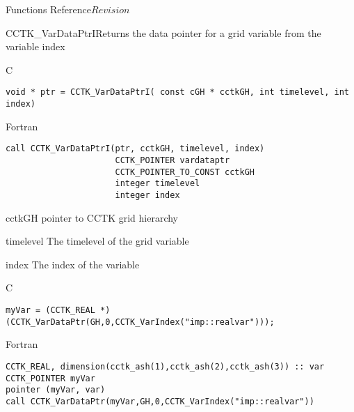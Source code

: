 \begin{cactuspart}{ Functions Reference}{}{$Revision$}
\begin{FunctionDescription}{CCTK\_VarDataPtrI}{Returns the data pointer for a grid variable from the variable index}
\label{CCTK-VarDataPtrI}
\begin{SynopsisSection}
\begin{Synopsis}{C}
\begin{verbatim}void * ptr = CCTK_VarDataPtrI( const cGH * cctkGH, int timelevel, int index)\end{verbatim}
\end{Synopsis}
\begin{Synopsis}{Fortran}
\begin{verbatim}
call CCTK_VarDataPtrI(ptr, cctkGH, timelevel, index)
                      CCTK_POINTER vardataptr
                      CCTK_POINTER_TO_CONST cctkGH
                      integer timelevel
                      integer index
\end{verbatim}
\end{Synopsis}
\end{SynopsisSection}
\begin{ParameterSection}
\begin{Parameter}{cctkGH}
pointer to CCTK grid hierarchy
\end{Parameter}
\begin{Parameter}{timelevel}
The timelevel of the grid variable
\end{Parameter}
\begin{Parameter}{index}
The index of the variable
\end{Parameter}
\end{ParameterSection}

\begin{ExampleSection}
\begin{Example}{C}
\begin{verbatim}
myVar = (CCTK_REAL *)(CCTK_VarDataPtr(GH,0,CCTK_VarIndex("imp::realvar")));
\end{verbatim}
\end{Example}
\begin{Example}{Fortran}
\begin{verbatim}
CCTK_REAL, dimension(cctk_ash(1),cctk_ash(2),cctk_ash(3)) :: var
CCTK_POINTER myVar
pointer (myVar, var)
call CCTK_VarDataPtr(myVar,GH,0,CCTK_VarIndex("imp::realvar"))
\end{verbatim}
\end{Example}
\end{ExampleSection}
\end{FunctionDescription}



\end{cactuspart}
